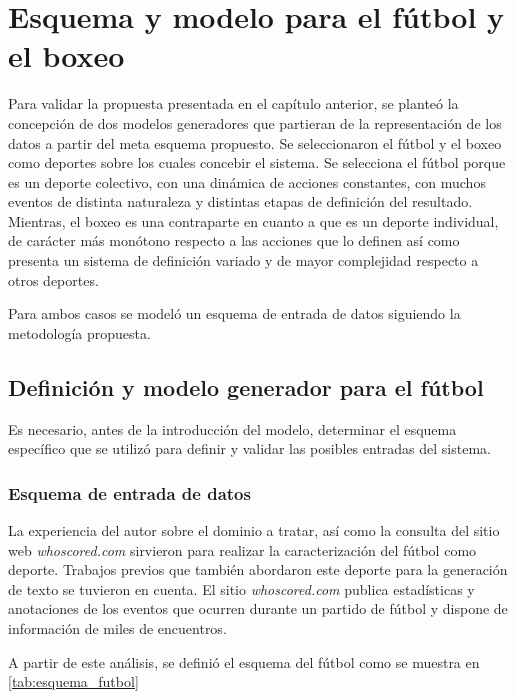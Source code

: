 \chapter{Esquema y modelo para el fútbol y el boxeo}\label{chapter:validation}

    Para validar la propuesta presentada en el capítulo anterior, se planteó la concepción de 
dos modelos generadores que partieran de la representación de los datos a partir del meta esquema propuesto. Se seleccionaron 
el fútbol y el boxeo como deportes sobre los cuales concebir el sistema. Se selecciona el fútbol porque es un deporte colectivo, 
con una dinámica de acciones constantes, con muchos eventos de distinta naturaleza y distintas etapas de definición del resultado. 
Mientras, el boxeo es una contraparte en cuanto a que es un deporte individual, de carácter más monótono respecto a las acciones que 
lo definen así como presenta un sistema de definición variado y de mayor complejidad respecto a otros deportes.  

    Para ambos casos se modeló un esquema de entrada de datos siguiendo la metodología propuesta.

\section{Definición y modelo generador para el fútbol}

    Es necesario, antes de la introducción del modelo, determinar el esquema específico que se utilizó para 
definir y validar las posibles entradas del sistema.

\subsection{Esquema de entrada de datos}

    La experiencia del autor sobre el dominio a tratar, así como la consulta del sitio web \textit{whoscored.com} sirvieron para realizar la caracterización del 
fútbol como deporte. Trabajos previos que también abordaron este deporte para la generación de texto  se tuvieron en cuenta. 
El sitio \textit{whoscored.com} publica estadísticas y anotaciones de los eventos que ocurren durante un partido de fútbol y dispone de información de miles de encuentros.

A partir de este análisis, se definió el esquema del fútbol como se muestra en \ref{tab:esquema_futbol}

